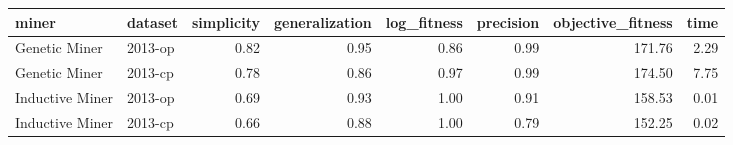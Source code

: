 \begin{tabular}{llrrrrrr}
\toprule
miner & dataset & simplicity & generalization & log_fitness & precision & objective_fitness & time \\
\midrule
Genetic Miner & 2013-op & 0.82 & 0.95 & 0.86 & 0.99 & 171.76 & 2.29 \\
Genetic Miner & 2013-cp & 0.78 & 0.86 & 0.97 & 0.99 & 174.50 & 7.75 \\
Inductive Miner & 2013-op & 0.69 & 0.93 & 1.00 & 0.91 & 158.53 & 0.01 \\
Inductive Miner & 2013-cp & 0.66 & 0.88 & 1.00 & 0.79 & 152.25 & 0.02 \\
\bottomrule
\end{tabular}
